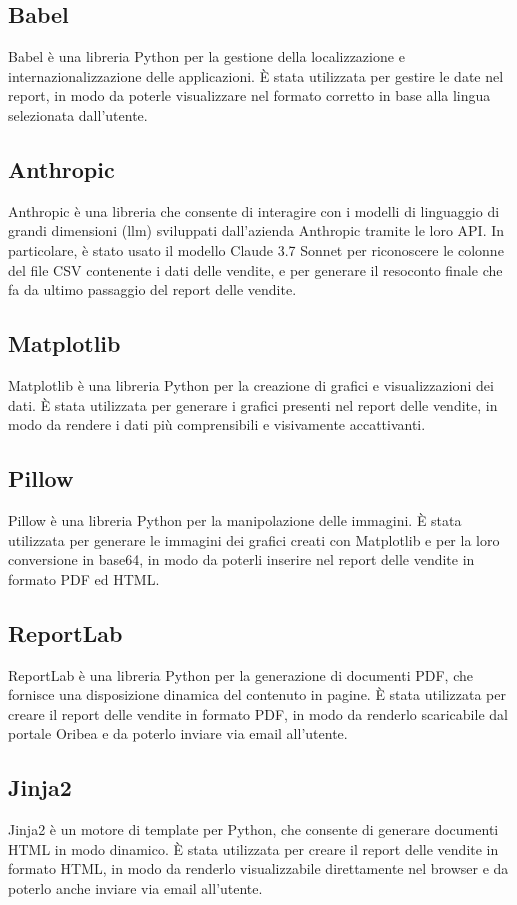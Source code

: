 \subsection{Babel}
Babel è una libreria Python per la gestione della localizzazione e internazionalizzazione delle applicazioni. È stata utilizzata per gestire le date nel report, in modo da poterle visualizzare nel formato corretto in base alla lingua selezionata dall'utente.

\subsection{Anthropic}
Anthropic è una libreria che consente di interagire con i modelli di linguaggio di grandi dimensioni (\gls{llm}\glsfirstoccur) sviluppati dall'azienda Anthropic tramite le loro API. In particolare, è stato usato il modello Claude 3.7 Sonnet per riconoscere le colonne del file CSV contenente i dati delle vendite, e per generare il resoconto finale che fa da ultimo passaggio del report delle vendite.

\subsection{Matplotlib}
Matplotlib è una libreria Python per la creazione di grafici e visualizzazioni dei dati. È stata utilizzata per generare i grafici presenti nel report delle vendite, in modo da rendere i dati più comprensibili e visivamente accattivanti.

\subsection{Pillow}
Pillow è una libreria Python per la manipolazione delle immagini. È stata utilizzata per generare le immagini dei grafici creati con Matplotlib e per la loro conversione in base64, in modo da poterli inserire nel report delle vendite in formato PDF ed HTML.

\subsection{ReportLab}
ReportLab è una libreria Python per la generazione di documenti PDF, che fornisce una disposizione dinamica del contenuto in pagine. È stata utilizzata per creare il report delle vendite in formato PDF, in modo da renderlo scaricabile dal portale Oribea e da poterlo inviare via email all'utente.

\subsection{Jinja2}
Jinja2 è un motore di template per Python, che consente di generare documenti HTML in modo dinamico. È stata utilizzata per creare il report delle vendite in formato HTML, in modo da renderlo visualizzabile direttamente nel browser e da poterlo anche inviare via email all'utente.

